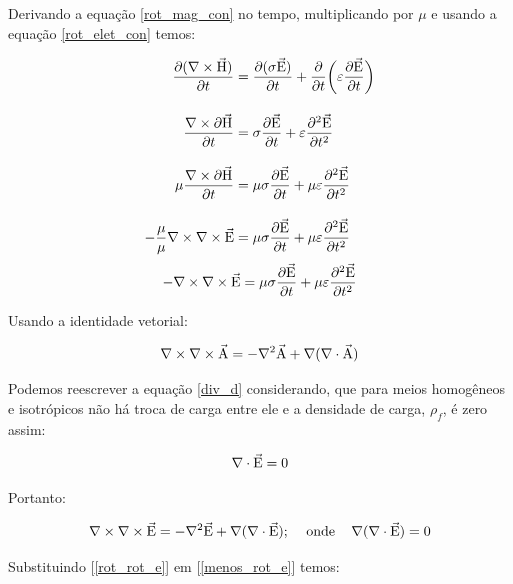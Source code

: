             Derivando a equação \ref{rot_mag_con} no tempo, multiplicando por $\mu$ e usando a equação \ref{rot_elet_con} temos:
            
            
\begin{align*}
\dfrac{\partial (\nabla \times \vec{\textrm{H}})}{\partial t} & = \dfrac{\partial (\sigma \vec{\textrm{E}})}{\partial t} + \dfrac{\partial}{\partial t} \bigg(\varepsilon \dfrac{\partial \vec{\textrm{E}}}{\partial t}\bigg)\\[10pt]
             \dfrac{\nabla \times \partial \vec{\textrm{H}}}{\partial t} & = \sigma \dfrac{\partial \vec{\textrm{E}}}{\partial t} + \varepsilon \dfrac{\partial^2 \vec{\textrm{E}}}{\partial t^2} \\[10pt]
             \mu \dfrac{\nabla \times \partial \vec{\textrm{H}}}{\partial t} & = \mu \sigma \dfrac{\partial \vec{\textrm{E}}}{\partial t} + \mu \varepsilon \dfrac{\partial^2 \vec{\textrm{E}}}{\partial t^2} \\[10pt]
             -\dfrac{\mu}{\mu} \nabla \times \nabla \times \vec{\textrm{E}} & = \mu \sigma \dfrac{\partial \vec{\textrm{E}}}{\partial t} + \mu \varepsilon \dfrac{\partial^2 \vec{\textrm{E}}}{\partial t^2}
             \end{align*}
             \begin{equation}
                \label{menos_rot_e}
              - \nabla \times \nabla \times \vec{\textrm{E}} = \mu \sigma \dfrac{\partial \vec{\textrm{E}}}{\partial t} + \mu \varepsilon \dfrac{\partial^2 \vec{\textrm{E}}}{\partial t^2}
             \end{equation}
                
            Usando a identidade vetorial:
            
            \begin{equation}
             \nabla \times \nabla \times \vec{\textrm{A}} = -\nabla^2 \vec{\textrm{A}} + \nabla(\nabla \cdot \vec{\textrm{A}})
            \end{equation}
            
            Podemos reescrever a equação \ref{div_d} considerando, que para meios homogêneos e isotrópicos não há troca de carga entre ele e a densidade de carga, $\rho_f$, é zero assim:
            
            \begin{equation}
             \nabla \cdot \vec{\textrm{E}} = 0
            \end{equation}
            
            Portanto:
            
            \begin{equation}
             \label{rot_rot_e}
             \nabla \times \nabla \times \vec{\textrm{E}} = -\nabla^2 \vec{\textrm{E}} + \nabla(\nabla \cdot \vec{\textrm{E}});\,\,\,\,\,\,\, \textrm{onde}\,\,\,\,\,\,\,   \nabla(\nabla \cdot \vec{\textrm{E}})=0
            \end{equation}
            
            Substituindo [\ref{rot_rot_e}] em [\ref{menos_rot_e}] temos:
            
